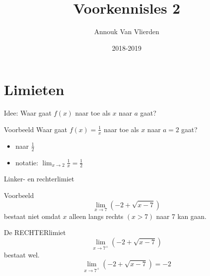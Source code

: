 \documentclass{beamer}
\title{Voorkennisles 2}
\author{Annouk Van Vlierden}
\date{2018-2019}
\newcommand{\ds}{\displaystyle}
\begin{document}
\begin{frame}
  \titlepage
\end{frame}



\section{Limieten}

\begin{frame}{Idee: Waar gaat $f(x)$ naar toe als $x$ naar $a$ gaat?}
\begin{exampleblock}{Voorbeeld}
Waar gaat $f(x)=\frac{1}{x}$ naar toe als $x$ naar $a=2$ gaat?
\begin{itemize}
	\item naar $\ds \frac{1}{2}$
	\item notatie:   $\displaystyle{\lim_{x \rightarrow 2}} \frac{1}{x} = \frac{1}{2} $
\end{itemize}


\end{exampleblock}

\end{frame}

\begin{frame}{Linker- en rechterlimiet}
\begin{exampleblock}{Voorbeeld}
$$\lim_{x \to 7} (-2 + \sqrt{x-7})$$ bestaat niet omdat $x$ alleen langs rechts $(x>7)$ naar 7 kan gaan.

De RECHTERlimiet $$\displaystyle \lim_{x  \to 7^+} (-2 + \sqrt{x-7}) $$ bestaat wel.  
$$\displaystyle \lim_{x  \to 7^+} (-2 + \sqrt{x-7})=-2 $$
\end{exampleblock}
\end{frame}
\end{document}
